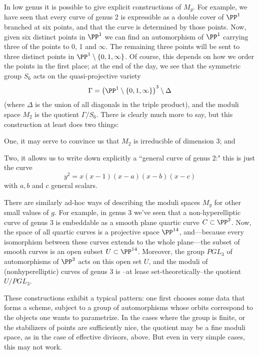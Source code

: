In low genus it is possible to give explicit constructions of $M_g$. For example, we have seen that every curve of genus 2 is expressible as a double cover of $\PP^1$ branched at six points, and  that the curve is determined by those points. Now, given six distinct points in $\PP^1$ we can find an automorphism of $\PP^1$ carrying three of the points to 0, 1 and $\infty$. The remaining three points will be sent to three distinct points in $\PP^1 \setminus \{0, 1, \infty \} $. Of course, this depends on how we order the points in the first place; at the end of the day, we see that the symmetric group $S_6$ acts on the quasi-projective variety
$$
\Gamma = \left( \PP^1 \setminus \{0, 1, \infty \} \right)^3 \setminus \Delta
$$
(where $\Delta$ is the union of all diagonals in the triple product), and the moduli space $M_2$ is the quotient $\Gamma/S_6$. There is clearly much more to say, but this construction at least does two things:

One, it may serve to convince us that $M_2$ is irreducible of dimension 3; and

Two, it allows us to write down explicitly a ``general curve of genus 2:" this is just the curve
$$
y^2 = x(x-1)(x-a)(x-b)(x-c)
$$
with $a, b$ and $c$ general scalars.

There are similarly ad-hoc ways of describing the moduli spaces $M_g$ for other small values of $g$. For example, in genus 3 we've seen that a non-hyperelliptic curve of genus 3 is embeddable as a smooth plane quartic curve $C \subset \PP^2$. Now, the space of all quartic curves is a projective space $\PP^{14}$, and---because every isomorphism between these curves extends to the whole plane---the subset of smooth curves is an open subset $U \subset \PP^{14}$. Moreover, the group $PGL_3$ of automorphisms of $\PP^2$ acts on this open set $U$, and  the moduli of (nonhyperelliptic) curves of genus 3 is --at lease set-theoretically--the quotient $U/PGL_3$.

These constructions exhibit a typical pattern: one first chooses some data that forms a scheme, subject to a group of automorphisms whose orbits correspond to the objects one wants to parametrize. In the cases where the group is finite, or the stabilizers of points are sufficiently nice, the quotient may be a fine moduli space, as in the case of effective divisors, above. But even in very simple cases, this may not work.

